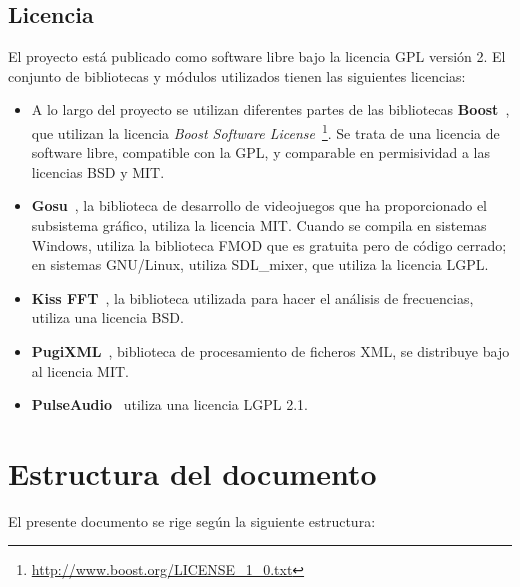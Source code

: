 \subsection{Licencia}
El proyecto está publicado como software libre bajo la licencia
\ac{GPL} versión 2. El conjunto de bibliotecas y módulos utilizados
tienen las siguientes licencias:
\begin{itemize}

\item A lo largo del proyecto se utilizan diferentes partes de las
  bibliotecas \textbf{Boost}~\cite{boost}, que utilizan la licencia
  \textit{Boost Software License}~\footnote{\url{http://www.boost.org/LICENSE_1_0.txt}}.
  Se trata de una licencia de software libre, compatible con la GPL, y
  comparable en permisividad a las licencias BSD y MIT.

\item \textbf{Gosu}~\cite{gosu}, la biblioteca de desarrollo de
  videojuegos que ha proporcionado el subsistema gráfico, utiliza la
  licencia \ac{MIT}. Cuando se compila en sistemas Windows, utiliza la
  biblioteca FMOD que es gratuita pero de código cerrado; en sistemas
  GNU/Linux, utiliza SDL\_mixer, que utiliza la licencia \ac{LGPL}.

\item \textbf{Kiss FFT}~\cite{kissfft}, la biblioteca utilizada para
  hacer el análisis de frecuencias, utiliza una licencia \ac{BSD}.

\item \textbf{PugiXML}~\cite{pugixml}, biblioteca de procesamiento de
  ficheros XML, se distribuye bajo al licencia MIT.

\item \textbf{PulseAudio}~\cite{pulseaudio} utiliza una licencia LGPL 2.1.
\end{itemize}

\section{Estructura del documento}
El presente documento se rige según la siguiente estructura:

